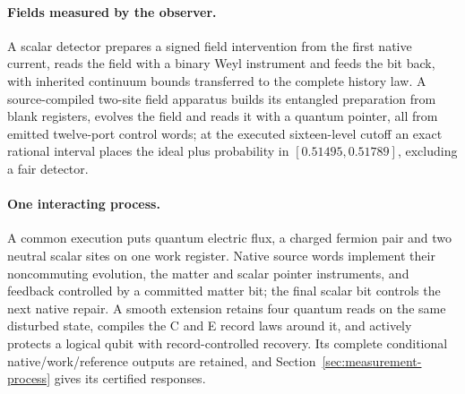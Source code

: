 \documentclass[11pt]{article}
\theoremstyle{definition}
\theoremstyle{remark}
\begin{document}
\paragraph{Fields measured by the observer.} A scalar detector prepares a
signed field intervention from the first native current, reads the field with
a binary Weyl instrument and feeds the bit back, with inherited continuum
bounds transferred to the complete history law. A source-compiled two-site
field apparatus builds its entangled preparation from blank registers,
evolves the field and reads it with a quantum pointer, all from emitted
twelve-port control words; at the executed sixteen-level cutoff an exact
rational interval places the ideal plus probability in
$[0.51495,0.51789]$, excluding a fair detector.

\paragraph{One interacting process.} A common execution puts
quantum electric flux, a charged fermion pair and two neutral scalar sites on
one work register. Native source words implement their noncommuting
evolution, the matter and scalar pointer instruments, and feedback
controlled by a committed matter bit; the final scalar bit controls the next
native repair. A smooth extension retains four quantum reads on the same
disturbed state, compiles the C and E record laws around it, and actively
protects a logical qubit with record-controlled recovery. Its complete
conditional native/work/reference outputs are retained, and
Section~\ref{sec:measurement-process} gives its certified responses.
\end{document}
